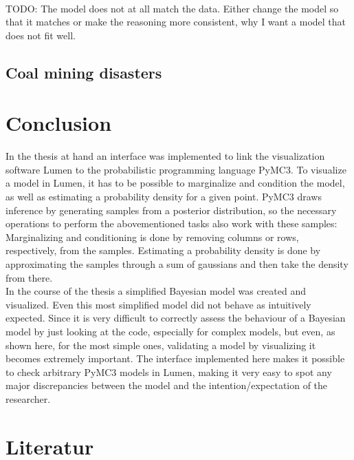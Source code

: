 \documentclass{article}
\begin{document}
\\
TODO: The model does not at all match the data. Either change the model so that it matches or make the reasoning more consistent, why I want a model that does not fit well.
\subsection{Coal mining disasters}



\section {Conclusion}
In the thesis at hand an interface was implemented to link the visualization software Lumen to the probabilistic programming language PyMC3. To visualize a model in Lumen, it has to be possible to marginalize and condition the model, as well as estimating a probability density for a given point. PyMC3 draws inference by generating samples from a posterior distribution, so the necessary operations to perform the abovementioned tasks also work with these samples: Marginalizing and conditioning is done by removing columns or rows, respectively, from the samples. Estimating a probability density is done by approximating the samples through a sum of gaussians and then take the density from there.\\
In the course of the thesis a simplified Bayesian model was created and visualized. Even this most simplified model did not behave as intuitively expected. Since it is very difficult to correctly assess the behaviour of a Bayesian model by just looking at the code, especially for complex models, but even, as shown here, for the most simple ones, validating a model by visualizing it becomes extremely important. The interface implemented here makes it possible to check arbitrary PyMC3 models in Lumen, making it very easy to spot any major discrepancies between the model and the intention/expectation of the researcher.
\listoffigures
        
\section{Literatur}



\end{document}
